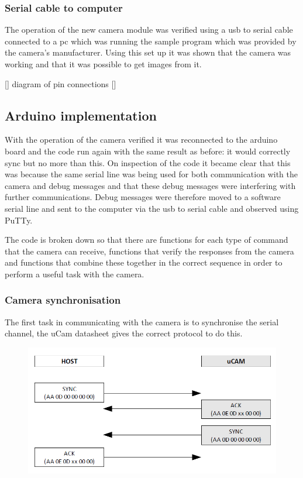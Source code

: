 \subsubsection{Serial cable to computer}

The operation of the new camera module was verified using a usb to serial cable connected to a pc which was running the sample program which was provided by the camera's manufacturer. Using this set up it was shown that the camera was working and that it was possible to get images from it.

[] diagram of pin connections []

\subsection{Arduino implementation}

With the operation of the camera verified it was reconnected to the arduino board and the code run again with the same result as before: it would correctly sync but no more than this. On inspection of the code it became clear that this was because the same serial line was being used for both communication with the camera and debug messages and that these debug messages were interfering with further communications. Debug messages were therefore moved to a software serial line and sent to the computer via the usb to serial cable and observed using PuTTy.

The code is broken down so that there are functions for each type of command that the camera can receive, functions that verify the responses from the camera and functions that combine these together in the correct sequence in order to perform a useful task with the camera.

\subsubsection{Camera synchronisation}

The first task in communicating with the camera is to synchronise the serial channel, the uCam datasheet gives the correct protocol to do this.

\begin{figure}[H]
        \centering
        \includegraphics[width=1.00\textwidth]{figures/SyncProtocal.png}
        \label{fig:syncProto}
\end{figure}

